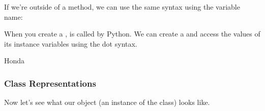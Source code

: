 \documentclass[letterpaper,10pt,english]{jupyterBook}
\begin{document}
\begin{sphinxVerbatim}[commandchars=\\\{\}]
  
\end{sphinxVerbatim}

\sphinxAtStartPar
If we’re outside of a method, we can use the same syntax using the variable name:

\begin{sphinxVerbatim}[commandchars=\\\{\}]
  
\end{sphinxVerbatim}

\sphinxAtStartPar
When you create a ,  is called by Python. We can create a  and access the values of its instance variables using the dot syntax.

\begin{sphinxVerbatim}[commandchars=\\\{\}]
     
\end{sphinxVerbatim}

\begin{sphinxVerbatim}[commandchars=\\\{\}]
\PYGZsq{}Honda\PYGZsq{}
\end{sphinxVerbatim}


\subsubsection{Class Representations}
\label{\detokenize{content/07-game-theory/python-classes:class-representations}}
\sphinxAtStartPar
Now let’s see what our  object (an instance of the  class) looks like.

\begin{sphinxVerbatim}[commandchars=\\\{\}]
\end{sphinxVerbatim}
\end{document}
